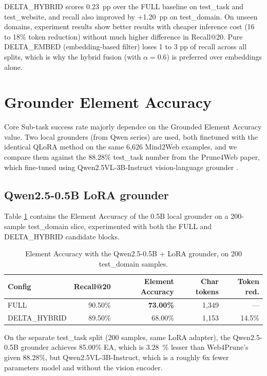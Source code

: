 DELTA\_HYBRID scores 0.23~pp over the FULL baseline on test\_task and test\_website, and recall also improved by +1.20~pp on test\_domain. On unseen domains, experiment results show better results with cheaper inference cost (16 to 18\% token reduction) without much higher difference in Recall@20. Pure DELTA\_EMBED (embedding-based filter) loses 1 to 3 pp of recall across all splits, which is why the hybrid fusion (with $\alpha = 0.6$) is preferred over embeddings alone.


\section{Grounder Element Accuracy}

Core Sub-task success rate majorly dependce on the Grounded Element Accuracy value. Two local grounders (from Qwen series) are used, both finetuned with the identical QLoRA method on the same 6,626 Mind2Web examples, and we compare them against the 88.28\% test\_task number from the Prune4Web paper, which fine-tuned using Qwen2.5VL-3B-Instruct vision-language grounder \cite{zhang2025prune4web}.

\subsection{Qwen2.5-0.5B LoRA grounder}

Table \ref{tab:ea_qwen25} contains the Element Accuracy of the 0.5B local grounder on a 200-sample test\_domain slice, experimented with both the FULL and DELTA\_HYBRID candidate blocks.

\begin{table}[h]
\centering
\small
\begin{tabular}{l|r|r|r|r}
\hline
\textbf{Config} & \textbf{Recall@20} & \textbf{Element Accuracy} & \textbf{Char tokens} & \textbf{Token red.} \\
\hline
FULL & 90.50\% & \textbf{73.00\%} & 1{,}349 & --- \\
DELTA\_HYBRID & 89.50\% & 68.00\% & 1{,}153 & 14.5\% \\
\hline
\end{tabular}
\caption{Element Accuracy with the Qwen2.5-0.5B + LoRA grounder, on 200 test\_domain samples.}
\label{tab:ea_qwen25}
\end{table}

On the separate test\_task split (200 samples, same LoRA adapter), the Qwen2.5-0.5B grounder achieves 85.00\% EA, which is 3.28~\% lesser than Web4Prune's given 88.28\%, but Qwen2.5VL-3B-Instruct, which is a roughly 6x fewer parameters model and without the vision encoder.


